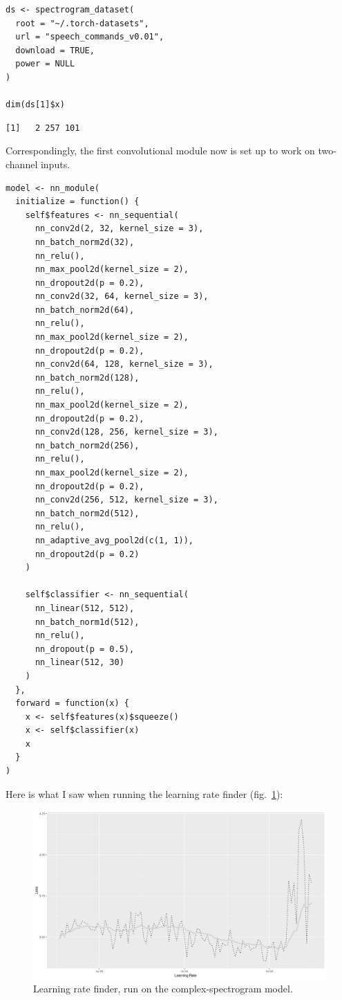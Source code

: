 \documentclass[
  letterpaper,
]{krantz}
\begin{document}
\begin{verbatim}
ds <- spectrogram_dataset(
  root = "~/.torch-datasets",
  url = "speech_commands_v0.01",
  download = TRUE,
  power = NULL
)

dim(ds[1]$x)
\end{verbatim}

\begin{verbatim}
[1]   2 257 101
\end{verbatim}

Correspondingly, the first convolutional module now is set up to work on
two-channel inputs.

\begin{verbatim}
model <- nn_module(
  initialize = function() {
    self$features <- nn_sequential(
      nn_conv2d(2, 32, kernel_size = 3),
      nn_batch_norm2d(32),
      nn_relu(),
      nn_max_pool2d(kernel_size = 2),
      nn_dropout2d(p = 0.2),
      nn_conv2d(32, 64, kernel_size = 3),
      nn_batch_norm2d(64),
      nn_relu(),
      nn_max_pool2d(kernel_size = 2),
      nn_dropout2d(p = 0.2),
      nn_conv2d(64, 128, kernel_size = 3),
      nn_batch_norm2d(128),
      nn_relu(),
      nn_max_pool2d(kernel_size = 2),
      nn_dropout2d(p = 0.2),
      nn_conv2d(128, 256, kernel_size = 3),
      nn_batch_norm2d(256),
      nn_relu(),
      nn_max_pool2d(kernel_size = 2),
      nn_dropout2d(p = 0.2),
      nn_conv2d(256, 512, kernel_size = 3),
      nn_batch_norm2d(512),
      nn_relu(),
      nn_adaptive_avg_pool2d(c(1, 1)),
      nn_dropout2d(p = 0.2)
    )

    self$classifier <- nn_sequential(
      nn_linear(512, 512),
      nn_batch_norm1d(512),
      nn_relu(),
      nn_dropout(p = 0.5),
      nn_linear(512, 30)
    )
  },
  forward = function(x) {
    x <- self$features(x)$squeeze()
    x <- self$classifier(x)
    x
  }
)
\end{verbatim}

Here is what I saw when running the learning rate finder
(fig.~\ref{fig-audio-lr-finder-complex}):

\begin{figure}[H]

{\centering \includegraphics{images/audio-lr-finder-complex.png}

}

\caption{\label{fig-audio-lr-finder-complex}Learning rate finder, run on
the complex-spectrogram model.}

\end{figure}
\end{document}
